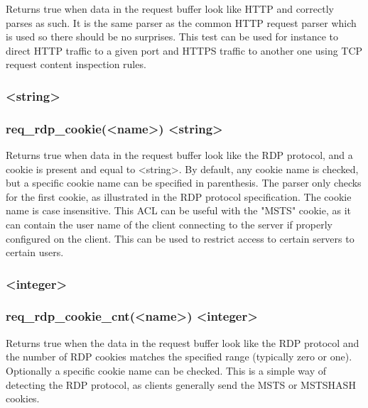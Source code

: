 \subsubsection[req\_proto\_http]{}

  Returns true when data in the request buffer look like HTTP and correctly
  parses as such. It is the same parser as the common HTTP request parser which
  is used so there should be no surprises. This test can be used for instance
  to direct HTTP traffic to a given port and HTTPS traffic to another one
  using TCP request content inspection rules.

\subsubsection[req\_rdp\_cookie]{ <string>}
\subsubsection*{req\_rdp\_cookie(<name>) <string>}

  Returns true when data in the request buffer look like the RDP protocol, and
  a cookie is present and equal to <string>. By default, any cookie name is
  checked, but a specific cookie name can be specified in parenthesis. The
  parser only checks for the first cookie, as illustrated in the RDP protocol
  specification. The cookie name is case insensitive. This ACL can be useful
  with the "MSTS" cookie, as it can contain the user name of the client
  connecting to the server if properly configured on the client. This can be
  used to restrict access to certain servers to certain users.

\subsubsection[req\_rdp\_cookie\_cnt]{ <integer>}
\subsubsection*{req\_rdp\_cookie\_cnt(<name>) <integer>}

  Returns true when the data in the request buffer look like the RDP protocol
  and the number of RDP cookies matches the specified range (typically zero or
  one). Optionally a specific cookie name can be checked. This is a simple way
  of detecting the RDP protocol, as clients generally send the MSTS or MSTSHASH
  cookies.

